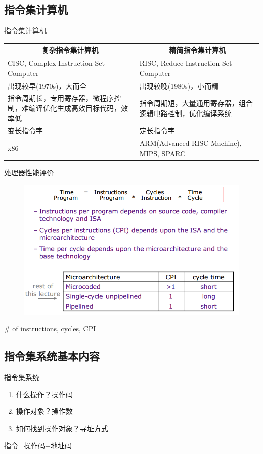 \documentclass[UTF8]{ctexbeamer}
\begin{document}
\subsection{指令集计算机}
\begin{frame}[fragile]{指令集计算机}
\begin{center}
\begin{tabular}{|p{5cm}|p{5cm}|}
\hline
\multicolumn{1}{|c|}{\textbf{复杂指令集计算机}} & \multicolumn{1}{c|}{\textbf{精简指令集计算机}} \\\hline
CISC, Complex Instruction Set Computer & RISC, Reduce Instruction Set Computer\\\hline
出现较早(1970s)，大而全 & 出现较晚(1980s)，小而精 \\\hline
指令周期长，专用寄存器，微程序控制，难编译优化生成高效目标代码，效率低 & 指令周期短，大量通用寄存器，组合逻辑电路控制，优化编译系统\\\hline
变长指令字 & 定长指令字 \\\hline
x86 & ARM(Advanced RISC Machine), MIPS, SPARC \\\hline
\end{tabular}
\end{center}
\end{frame}

\begin{frame}{处理器性能评价}
\begin{figure}
\centering
\includegraphics[width=\linewidth]{fig/Lecture2/processor_performance.PNG}
\end{figure}
\# of instructions, cycles, CPI
\end{frame}

\subsection{指令集系统基本内容}
\begin{frame}{指令集系统}
\begin{enumerate}
	\item 什么操作？操作码
	\item 操作对象？操作数
	\item 如何找到操作对象？寻址方式 %
\end{enumerate}
指令=操作码+地址码
\end{frame}
\end{document}
